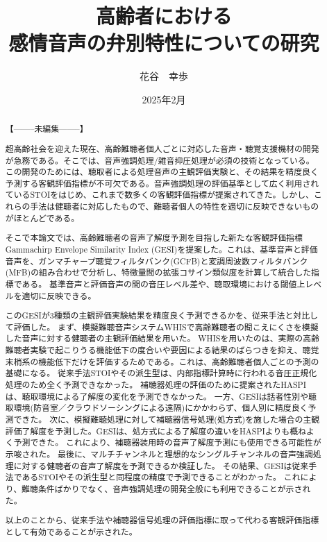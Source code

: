 \documentclass[11pt]{jreport}
\title{高齢者における\\感情音声の弁別特性についての研究}
\author{花谷　幸歩}
\date{2025年2月}	%
\begin{document}
\maketitle



\begin{abstract}
【--------未編集--------】

超高齢社会を迎えた現在、高齢難聴者個人ごとに対応した音声・聴覚支援機材の開発が急務である。そこでは、音声強調処理/雑音抑圧処理が必須の技術となっている。この開発のためには、聴取者による処理音声の主観評価実験と、その結果を精度良く予測する客観評価指標が不可欠である。音声強調処理の評価基準として広く利用されているSTOIをはじめ、これまで数多くの客観評価指標が提案されてきた。しかし、これらの手法は健聴者に対応したもので、難聴者個人の特性を適切に反映できないものがほとんどである。

そこで本論文では、高齢難聴者の音声了解度予測を目指した新たな客観評価指標Gammachirp Envelope Similarity Index (GESI)を提案した。これは、基準音声と評価音声を、ガンマチャープ聴覚フィルタバンク(GCFB)と変調周波数フィルタバンク(MFB)の組み合わせで分析し、特徴量間の拡張コサイン類似度を計算して統合した指標である。
基準音声と評価音声の間の音圧レベル差や、聴取環境における閾値上レベルを適切に反映できる。

このGESIが3種類の主観評価実験結果を精度良く予測できるかを、従来手法と対比して評価した。
まず、模擬難聴音声システムWHISで高齢難聴者の聞こえにくさを模擬した音声に対する健聴者の主観評価結果を用いた。
WHISを用いたのは、実際の高齢難聴者実験で起こりうる機能低下の度合いや要因による結果のばらつきを抑え、聴覚末梢系の機能低下だけを評価するためである。これは、高齢難聴者個人ごとの予測の基礎になる。
従来手法STOIやその派生型は、内部指標計算時に行われる音圧正規化処理のため全く予測できなかった。
補聴器処理の評価のために提案されたHASPIは、聴取環境による了解度の変化を予測できなかった。
一方、GESIは話者性別や聴取環境(防音室／クラウドソーシングによる遠隔)にかかわらず、個人別に精度良く予測できた。
次に、模擬難聴処理に対して補聴器信号処理(処方式)を施した場合の主観評価了解度を予測した。GESIは、処方式による了解度の違いをHASPIよりも概ねよく予測できた。
これにより、補聴器装用時の音声了解度予測にも使用できる可能性が示唆された。
最後に、マルチチャンネルと理想的なシングルチャンネルの音声強調処理に対する健聴者の音声了解度を予測できるか検証した。
その結果、GESIは従来手法であるSTOIやその派生型と同程度の精度で予測できることがわかった。
これにより、難聴条件ばかりでなく、音声強調処理の開発全般にも利用できることが示された。

以上のことから、従来手法や補聴器信号処理の評価指標に取って代わる客観評価指標として有効であることが示された。

\end{abstract}
\end{document}
